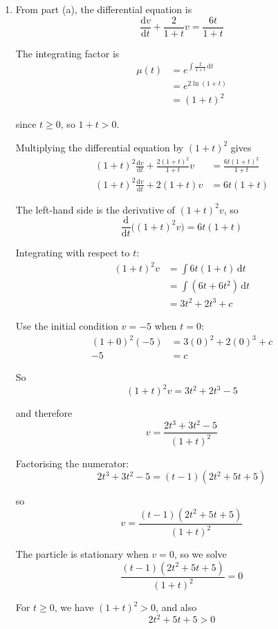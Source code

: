 \documentclass[leqno]{article}
\begin{document}
\begin{enumerate}[
  label=\textbf{\arabic*.},
  leftmargin=*,
  topsep=0pt,
  partopsep=0pt,
  parsep=0pt
]
\begin{djsSolution}
\begin{enumerate}[label=\textbf{(\alph*)}]
  Hence
  \[
  P(t)=\frac{2}{1+t}
  \qquad \text{and} \qquad
  Q(t)=\frac{6t}{1+t}
  \]

  \item From part (a), the differential equation is
  \[
  \frac{\mathrm{d}v}{\mathrm{d}t}+\frac{2}{1+t}v=\frac{6t}{1+t}
  \]

  The integrating factor is
  \begin{align*}
  \mu(t) &= e^{\int \frac{2}{1+t}\, \mathrm{d}t} \\
  &= e^{2\ln(1+t)} \\
  &= (1+t)^2
  \end{align*}

  since $t\geq 0$, so $1+t>0$.

  Multiplying the differential equation by $(1+t)^2$ gives
  \begin{align*}
  (1+t)^2\frac{\mathrm{d}v}{\mathrm{d}t}+\frac{2(1+t)^2}{1+t}v &= \frac{6t(1+t)^2}{1+t} \\
  (1+t)^2\frac{\mathrm{d}v}{\mathrm{d}t}+2(1+t)v &= 6t(1+t)
  \end{align*}

  The left-hand side is the derivative of $(1+t)^2v$, so
  \[
  \frac{\mathrm{d}}{\mathrm{d}t}\bigl((1+t)^2v\bigr) = 6t(1+t)
  \]

  Integrating with respect to $t$:
  \begin{align*}
  (1+t)^2v &= \int 6t(1+t)\, \mathrm{d}t \\
  &= \int (6t+6t^2)\, \mathrm{d}t \\
  &= 3t^2+2t^3+c
  \end{align*}

  Use the initial condition $v=-5$ when $t=0$:
  \begin{align*}
  (1+0)^2(-5) &= 3(0)^2+2(0)^3+c \\
  -5 &= c
  \end{align*}

  So
  \[
  (1+t)^2v = 3t^2+2t^3-5
  \]

  and therefore
  \[
  v=\frac{2t^3+3t^2-5}{(1+t)^2}
  \]

  Factorising the numerator:
  \[
  2t^3+3t^2-5 = (t-1)(2t^2+5t+5)
  \]

  so
  \[
  v=\frac{(t-1)(2t^2+5t+5)}{(1+t)^2}
  \]

  The particle is stationary when $v=0$, so we solve
  \[
  \frac{(t-1)(2t^2+5t+5)}{(1+t)^2}=0
  \]

  For $t\geq 0$, we have $(1+t)^2>0$, and also
  \[
  2t^2+5t+5>0
  \]


\end{enumerate}
\end{djsSolution}
\end{enumerate}
\end{document}
